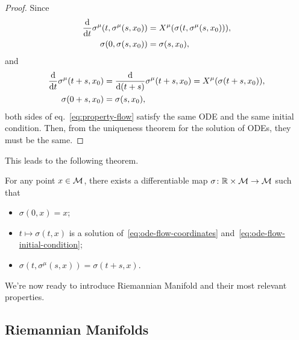\begin{proof}
    Since
    \begin{align*}
        \frac{\mathop{}\!\mathrm{d}}{\mathop{}\!\mathrm{d} t} \sigma^\mu (t, \sigma^\mu(s,x_0)) &= X^\mu (\sigma(t, \sigma^\mu(s,x_0))), \\
        \sigma(0,\sigma(s,x_0)) &= \sigma(s,x_0),
    \end{align*}
    and
    \begin{align*}
        \frac{\mathop{}\!\mathrm{d}}{\mathop{}\!\mathrm{d} t} \sigma^\mu (t+s,x_0) &= \frac{\mathop{}\!\mathrm{d}}{\mathop{}\!\mathrm{d}(t+s)} \sigma^\mu(t+s,x_0) = X^\mu(\sigma(t+s,x_0)), \\
        \sigma(0+s,x_0) &= \sigma(s,x_0),
    \end{align*}
    both sides of eq.~\eqref{eq:property-flow} satisfy the same ODE and the same initial condition. Then, from the uniqueness theorem for the solution of ODEs, they must be the same.
\end{proof}

This leads to the following theorem.
\begin{theorem}
    For any point $x \in \mathcal{M}$, there exists a differentiable map $\sigma \colon \mathbb{R} \times \mathcal{M} \to \mathcal{M}$ such that
    \begin{itemize}
        \item $\sigma(0,x) = x$;
        \item $t \mapsto \sigma(t,x)$ is a solution of~\eqref{eq:ode-flow-coordinates} and~\eqref{eq:ode-flow-initial-condition};
        \item $\sigma(t,\sigma^\mu(s,x)) = \sigma(t+s,x)$.
    \end{itemize}
\end{theorem}

We're now ready to introduce Riemannian Manifold and their most relevant properties.

\subsection{Riemannian Manifolds}